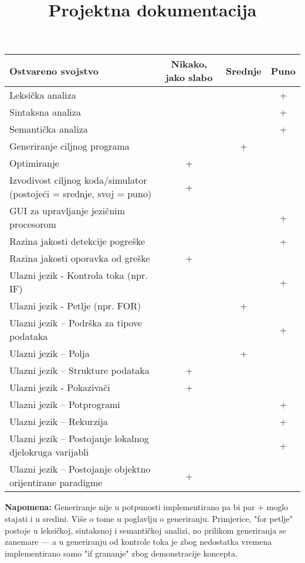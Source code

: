\documentclass{ppjdoc}
\begin{document}
\title{Projektna dokumentacija}

\maketitle

\begin{center}
  \begin{tabular}{ | p{8cm} | c | c | c | }
	\hline Ostvareno svojstvo & Nikako, jako slabo & Srednje & Puno \\
	\hline 
    \hline Leksička analiza & & & + \\ 
    \hline Sintaksna analiza & & & + \\ 
    \hline Semantička analiza & & & + \\ 
    \hline Generiranje ciljnog programa & & + & \\ 
    \hline Optimiranje & + & & \\ 
    \hline Izvodivost ciljnog koda/simulator (postojeći = srednje, svoj = puno) & + & & \\ 
    \hline GUI za upravljanje jezičnim procesorom & & & + \\ 
    \hline Razina jakosti detekcije pogreške & & & + \\ 
	\hline Razina jakosti oporavka od greške & + & & \\
    \hline Ulazni jezik - Kontrola toka (npr. IF) & & & + \\
    \hline Ulazni jezik - Petlje (npr. FOR) & & + & \\
    \hline Ulazni jezik – Podrška za tipove podataka & & & + \\
    \hline Ulazni jezik – Polja & & + &  \\
    \hline Ulazni jezik – Strukture podataka & + & & \\
    \hline Ulazni jezik - Pokazivači & + & & \\
    \hline Ulazni jezik – Potprogrami & & & + \\
    \hline Ulazni jezik – Rekurzija & & & + \\
    \hline Ulazni jezik – Postojanje lokalnog djelokruga varijabli & & & + \\
    \hline Ulazni jezik – Postojanje objektno orijentirane paradigme & + & & \\
	\hline
  \end{tabular}
\end{center}
\vspace{2cm}
\textbf{Napomena:} Generiranje nije u potpunosti implementirano pa bi par + moglo stajati i u sredini. Više o tome u poglavlju o 
generiranju. Primjerice, "for petlje" postoje u leksičkoj, sintaksnoj i semantičkoj analizi, no prilikom generiranja se zanemare ---
a u generiranju od kontrole toka je zbog nedostatka vremena implementirano samo "if grananje" zbog demonstracije koncepta.
\pagebreak
\end{document}
